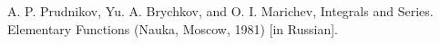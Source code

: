\documentclass[final,11pt,3p]{elsarticle}
\begin{document}
A. P. Prudnikov, Yu. A. Brychkov, and O. I. Marichev, Integrals and Series. Elementary Functions (Nauka, Moscow, 1981) [in Russian].



% 









\end{document}
